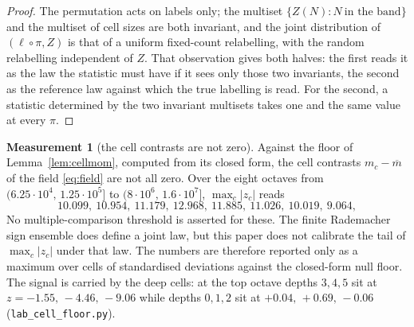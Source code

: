 \documentclass[11pt,a4paper]{article}
\theoremstyle{plain}
\theoremstyle{definition}
\newtheorem{measurement}[theorem]{Measurement}
\theoremstyle{remark}
\begin{document}
\begin{proof}
The permutation acts on labels only; the multiset
$\{Z(N):N\ \text{in the band}\}$ and the multiset of cell sizes are
both invariant, and the joint distribution of $(\ell\circ\pi,Z)$ is that of a uniform
fixed-count relabelling, with the random relabelling independent of
$Z$. That observation gives both halves: the
first reads it as the law the statistic must have if it sees only
those two invariants, the second as the reference law against which
the true labelling is read. For the second, a statistic determined by the two
invariant multisets takes one and the same value at every $\pi$.
\end{proof}

\begin{measurement}[the cell contrasts are not zero]\label{meas:notzero}
Against the floor of Lemma~\ref{lem:cellmom}, computed from its closed
form, the cell contrasts $m_c-\overline m$ of the field
\eqref{eq:field} are not all zero. Over
the eight octaves from $(6.25\cdot10^4,\,1.25\cdot10^5]$ to
$(8\cdot10^6,\,1.6\cdot10^7]$, $\max_c|z_c|$ reads
\[
  10.099,\ 10.954,\ 11.179,\ 12.968,\ 11.885,\ 11.026,\ 10.019,\ 9.064,
\]
No multiple-comparison threshold is asserted for these. The finite
Rademacher sign ensemble does define a joint law, but this paper does
not calibrate the tail of $\max_c|z_c|$ under that law. The numbers are
therefore reported only as a maximum over cells of standardised
deviations against the closed-form null floor. The signal is carried by the deep cells:
at the top octave depths $3,4,5$ sit at $z=-1.55,\,-4.46,\,-9.06$
while depths $0,1,2$ sit at $+0.04,\,+0.69,\,-0.06$
(\texttt{lab\_cell\_floor.py}).
\end{measurement}
\end{document}

